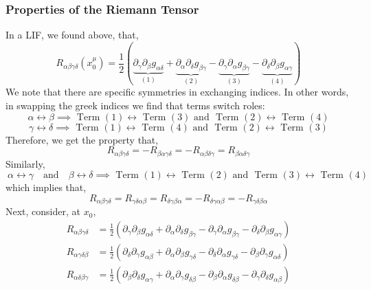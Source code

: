 \documentclass[11pt, a4paper]{article}
\begin{document}
\subsubsection{Properties of the Riemann Tensor}
In a LIF, we found above, that,  
\[R_{\alpha\beta\gamma\delta} (x^\mu_0) = \frac{1}{2}\left(\underbrace{\partial_\gamma\partial_\beta g_{\alpha\delta}}_{(1)} + \underbrace{\partial_\alpha\partial_\delta g_{\beta\gamma}}_{(2)}- \underbrace{ \partial_\gamma\partial_\alpha g_{\beta\gamma} }_{(3)}-\underbrace{ \partial_\delta\partial_\beta g_{\alpha\gamma}}_{(4)}\right)\]
We note that there are specific symmetries in exchanging indices. In other words, in swapping the greek indices we find that terms switch roles:
\[\alpha \leftrightarrow \beta \implies \text{ Term $(1)$} \leftrightarrow \text{ Term $(3)$} \text{ and } \text{ Term $(2)$} \leftrightarrow \text{ Term $(4)$}\]
\[ \gamma\leftrightarrow \delta \implies \text{ Term $(1)$} \leftrightarrow \text{ Term $(4)$} \text{ and } \text{ Term $(2)$} \leftrightarrow \text{ Term $(3)$}\]
Therefore, we get the property that, 
\[R_{\alpha\beta\gamma\delta} = -R_{\beta\alpha \gamma\delta} =-R_{\alpha\beta\delta\gamma} = R_{\beta \alpha \delta \gamma}\]
Similarly, 
\[\ \alpha\leftrightarrow \gamma \quad \text{and} \quad \beta\leftrightarrow\delta \implies \text{ Term $(1)$} \leftrightarrow \text{ Term $(2)$} \text{ and } \text{ Term $(3)$} \leftrightarrow \text{ Term $(4)$}\]
which implies that, 
\[R_{\alpha\beta\gamma\delta} = R_{\gamma\delta\alpha\beta} = R_{\delta\gamma\beta \alpha} = -R_{\delta\gamma\alpha\beta} = - R_{\gamma\delta\beta\alpha}\]
Next, consider, at $x_0$,
\begin{align*}
R_{\alpha \beta \gamma \delta} & = \tfrac{1}{2}\left( \partial_\gamma\partial_\beta g_{\alpha\delta} + \partial_\alpha\partial_\delta g_{\beta\gamma} - \partial_\gamma\partial_\alpha g_{\beta\gamma} - \partial_\delta\partial_\beta g_{\alpha\gamma} \right)
\\
R_{\alpha \gamma \delta \beta} & = \tfrac{1}{2}\left( \partial_\delta \partial_\gamma g_{\alpha\beta} + \partial_\alpha\partial_\beta g_{\gamma\delta} - \partial_\delta\partial_\alpha g_{\gamma\delta} - \partial_\beta\partial_\gamma g_{\alpha\delta} \right)
\\
R_{\alpha \delta \beta \gamma} & = \tfrac{1}{2}\left( \partial_\beta\partial_\delta g_{\alpha\gamma} + \partial_\alpha\partial_\gamma g_{\delta\beta} - \partial_\beta\partial_\alpha g_{\delta\beta} - \partial_\gamma\partial_\delta g_{\alpha\beta} \right) 
\end{align*}
\end{document}
